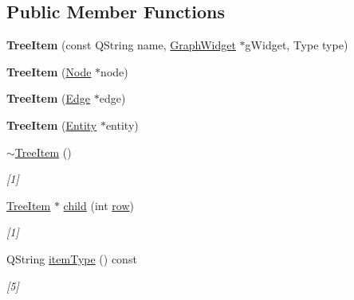 \subsection*{Public Member Functions}
\begin{DoxyCompactItemize}
\item 
\mbox{\label{class_tree_item_a6ed87ae4bbf9d6c4e5f30a9a04f78e5d}} 
{\bfseries Tree\+Item} (const Q\+String name, \hyperlink{class_graph_widget}{Graph\+Widget} $\ast$g\+Widget, Type type)
\item 
\mbox{\label{class_tree_item_ac4c08ec7690290b943901c41f3154447}} 
{\bfseries Tree\+Item} (\hyperlink{class_node}{Node} $\ast$node)
\item 
\mbox{\label{class_tree_item_a4a0984aa6d46f0d964190133a4d17892}} 
{\bfseries Tree\+Item} (\hyperlink{class_edge}{Edge} $\ast$edge)
\item 
\mbox{\label{class_tree_item_a3fde829861a772eaa769efa6fe86ac45}} 
{\bfseries Tree\+Item} (\hyperlink{class_entity}{Entity} $\ast$entity)
\item 
\mbox{\label{class_tree_item_a859429185d908c3e54861bbbfb185425}} 
\hyperlink{class_tree_item_a859429185d908c3e54861bbbfb185425}{$\sim$\+Tree\+Item} ()
\begin{DoxyCompactList}\small\item\em \mbox{[}1\mbox{]} \end{DoxyCompactList}\item 
\hyperlink{class_tree_item}{Tree\+Item} $\ast$ \hyperlink{class_tree_item_a80ab3164e41c8a43f1a9ef7255d88249}{child} (int \hyperlink{class_tree_item_a91ba04ea12214af828bb198c2b98fa66}{row})
\begin{DoxyCompactList}\small\item\em \mbox{[}1\mbox{]} \end{DoxyCompactList}\item 
\mbox{\label{class_tree_item_a7c0a87a7357e2d971824e2309ef8a603}} 
Q\+String \hyperlink{class_tree_item_a7c0a87a7357e2d971824e2309ef8a603}{item\+Type} () const
\begin{DoxyCompactList}\small\item\em \mbox{[}5\mbox{]} \end{DoxyCompactList}\item 

\end{DoxyCompactItemize}
